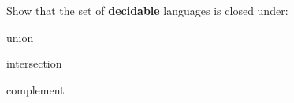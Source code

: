 \documentclass[12pt]{article}
\newenvironment{exercise}[2][Exercise]{\begin{trivlist}
\item[\hskip \labelsep {\bfseries #1}\hskip \labelsep {\bfseries #2.}]}{\end{trivlist}}
\newenvironment{solution}[1][{\color{red} Solution:}]{\begin{trivlist}
\item[\hskip \labelsep {\bfseries #1}\hskip \labelsep {\bfseries}]}{\end{trivlist}}
\begin{document}

\begin{exercise}{2}
Show that the set of \textbf{decidable} languages is closed under:
\begin{enumerate}[(a)]
	\item union
	\begin{solution}
	\end{solution}

	\item intersection
	\begin{solution}
	\end{solution}

	\item complement
	\begin{solution}
	\end{solution}
\end{enumerate}
\end{exercise}
\clearpage
\end{document}
